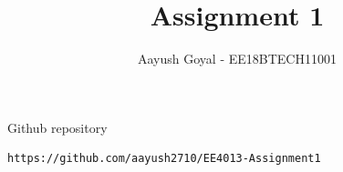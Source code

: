 \documentclass[journal,12pt,twocolumn]{IEEEtran}
\DeclareMathOperator*{\Res}{Res}
\begin{document}
\newtheorem{theorem}{Theorem}[section]
\newtheorem{problem}{Problem}
\newtheorem{proposition}{Proposition}[section]
\newtheorem{lemma}{Lemma}[section]
\newtheorem{corollary}[theorem]{Corollary}
\newtheorem{example}{Example}[section]
\newtheorem{definition}[problem]{Definition}

\newcommand{\BEQA}{\begin{eqnarray}}
\newcommand{\EEQA}{\end{eqnarray}}
\newcommand{\define}{\stackrel{\triangle}{=}}

\raggedbottom
\setlength{\parindent}{0pt}
\providecommand{\mbf}{\mathbf}
\providecommand{\pr}[1]{\ensuremath{\Pr\left(#1\right)}}
\providecommand{\qfunc}[1]{\ensuremath{Q\left(#1\right)}}
\providecommand{\sbrak}[1]{\ensuremath{{}\left[#1\right]}}
\providecommand{\lsbrak}[1]{\ensuremath{{}\left[#1\right.}}
\providecommand{\rsbrak}[1]{\ensuremath{{}\left.#1\right]}}
\providecommand{\brak}[1]{\ensuremath{\left(#1\right)}}
\providecommand{\lbrak}[1]{\ensuremath{\left(#1\right.}}
\providecommand{\rbrak}[1]{\ensuremath{\left.#1\right)}}
\providecommand{\cbrak}[1]{\ensuremath{\left\{#1\right\}}}
\providecommand{\lcbrak}[1]{\ensuremath{\left\{#1\right.}}
\providecommand{\rcbrak}[1]{\ensuremath{\left.#1\right\}}}
\theoremstyle{remark}
\newtheorem{rem}{Remark}
\newcommand{\sgn}{\mathop{\mathrm{sgn}}}
\providecommand{\fourier}{\overset{\mathcal{F}}{ \rightleftharpoons}}
\providecommand{\system}{\overset{\mathcal{H}}{ \longleftrightarrow}}
\newcommand{\solution}{\noindent \textbf{Solution: }}
\newcommand{\cosec}{\,\text{cosec}\,}
\providecommand{\dec}[2]{\ensuremath{\overset{#1}{\underset{#2}{\gtrless}}}}
\newcommand{\myvec}[1]{\ensuremath{\begin{pmatrix}#1\end{pmatrix}}}
\newcommand{\mydet}[1]{\ensuremath{\begin{vmatrix}#1\end{vmatrix}}}
\def\putbox#1#2#3{\makebox[0in][l]{\makebox[#1][l]{}\raisebox{\baselineskip}[0in][0in]{\raisebox{#2}[0in][0in]{#3}}}}
     \def\rightbox#1{\makebox[0in][r]{#1}}
     \def\centbox#1{\makebox[0in]{#1}}
     \def\topbox#1{\raisebox{-\baselineskip}[0in][0in]{#1}}
     \def\midbox#1{\raisebox{-0.5\baselineskip}[0in][0in]{#1}}
\vspace{3cm}
\title{Assignment 1}
\author{Aayush Goyal - EE18BTECH11001}
\maketitle
\newpage
\bigskip
Github repository
%
\begin{lstlisting}
https://github.com/aayush2710/EE4013-Assignment1
\end{lstlisting}
\setcounter{figure}{0}
\end{document}
